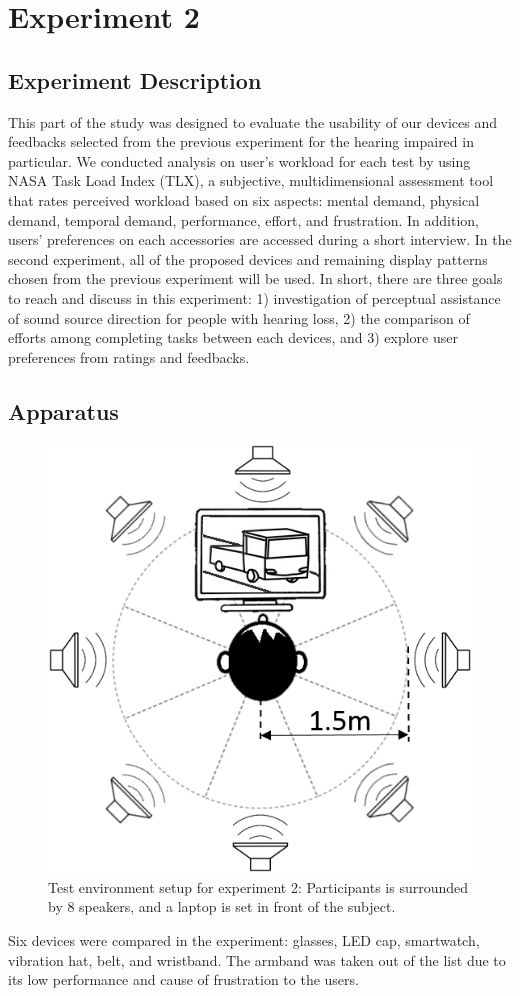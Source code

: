 \documentclass{sigchi}
\begin{document}
\section{Experiment 2}
\subsection{Experiment Description}
This part of the study was designed to evaluate the usability of our devices and feedbacks selected from the previous experiment for the hearing impaired in particular. We conducted analysis on user's workload for each test by using NASA Task Load Index (TLX), a subjective, multidimensional assessment tool that rates perceived workload based on six aspects: mental demand, physical demand, temporal demand, performance, effort, and frustration. In addition, users’ preferences on each accessories are accessed during a short interview. In the second experiment, all of the proposed devices and remaining display patterns chosen from the previous experiment will be used. In short, there are three goals to reach and discuss in this experiment: 1) investigation of perceptual assistance of sound source direction for people with hearing loss, 2) the comparison of efforts among completing tasks between each devices, and 3) explore user preferences from ratings and feedbacks.

\subsection{Apparatus}

\begin{figure}[!t]
\centering
\includegraphics[width=0.6\columnwidth]{apparatus3}
\caption{Test environment setup for experiment 2: Participants is surrounded by 8 speakers, and a laptop is set in front of the subject.}
\label{fig:speakers}
\end{figure}
Six devices were compared in the experiment: glasses, LED cap, smartwatch, vibration hat, belt, and wristband. The armband was taken out of the list due to its low performance and cause of frustration to the users.
\end{document}

